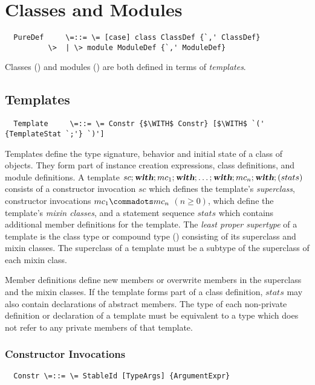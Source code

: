 \documentclass[11pt]{report}
\begin{document}
\chapter{Classes and Modules}
\label{sec:globaldefs}

\syntax\begin{verbatim}
  PureDef     \=::= \= [case] class ClassDef {`,' ClassDef}
	      \>  | \> module ModuleDef {`,' ModuleDef}
\end{verbatim}

Classes () and modules
() are both defined in terms of {\em templates}.

\section{Templates}
\label{sec:templates}

\syntax\begin{verbatim}
  Template     \=::= \= Constr {$\WITH$ Constr} [$\WITH$ `(' {TemplateStat `;'} `)']
\end{verbatim}

Templates define the type signature, behavior and initial state of a
class of objects. They form part of instance creation expressions,
class definitions, and module definitions.  A template
$sc;\mbox{\sl\bfseries with};mc_1;\mbox{\sl\bfseries with};\ldots;\mbox{\sl\bfseries with};mc_n;\mbox{\sl\bfseries with};(stats)$ consists of a
constructor invocation $sc$ which defines the template's {\em
superclass}, constructor invocations $mc_1 \commadots mc_n$ $(n \geq
0)$, which define the template's {\em mixin classes}, and a statement
sequence $stats$ which contains additional member definitions for the
template.  The {\em least proper supertype} of a template is the class
type or compound type () consisting of its
superclass and mixin classes. The superclass of a template must be a
subtype of the superclass of each mixin class.

Member definitions define new members or overwrite members in the
superclass and the mixin classes.  If the template forms part of a
class definition, $stats$ may also contain declarations of abstract
members. The type of each non-private definition or declaration of a
template must be equivalent to a type which does not refer to any
private members of that template.

\subsection{Constructor Invocations}
\label{sec:constr-invoke}
\syntax\begin{verbatim}
  Constr \=::= \= StableId [TypeArgs] {ArgumentExpr}
\end{verbatim}
\end{document}

